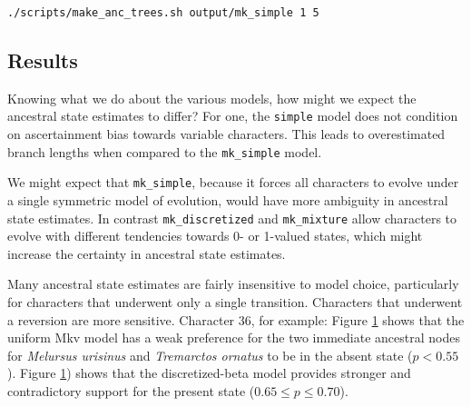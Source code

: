 {\tt \begin{snugshade*}
\begin{lstlisting}
./scripts/make_anc_trees.sh output/mk_simple 1 5
\end{lstlisting}
\end{snugshade*}}




\subsection{Results}

Knowing what we do about the various models, how might we expect the ancestral state estimates to differ?
For one, the {\tt simple} model does not condition on ascertainment bias towards variable characters.
This leads to overestimated branch lengths when compared to the {\tt mk\_simple} model.

We might expect that {\tt mk\_simple}, because it forces all characters to evolve under a single symmetric model of evolution, would have more ambiguity in ancestral state estimates.
In contrast {\tt mk\_discretized} and {\tt mk\_mixture} allow characters to evolve with different tendencies towards 0- or 1-valued states, which might increase the certainty in ancestral state estimates.


Many ancestral state estimates are fairly insensitive to model choice, particularly for characters that underwent only a single transition.
Characters that underwent a reversion are more sensitive.
Character 36, for example:
Figure \ref{fig:mk_simple_ase} shows that the uniform Mkv model has a weak preference for the two immediate ancestral nodes for {\it Melursus urisinus} and {\it Tremarctos ornatus} to be in the absent state ($p < 0.55$).
Figure \ref{fig:mk_simple_ase}) shows that the discretized-beta model provides stronger and contradictory support for the present state ($0.65 \leq p \leq 0.70$).

\begin{figure}[h!]
\label{fig:mk_simple_ase}
\end{figure}

\begin{figure}[h!]
\label{fig:mk_discretized_ase}
\end{figure}

